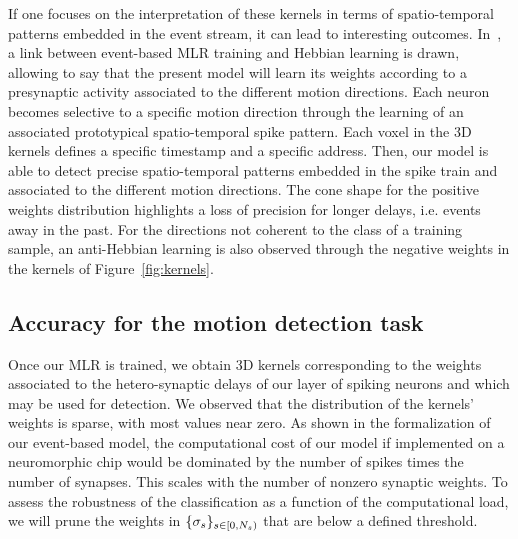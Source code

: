 \documentclass[default]{sn-jnl}%
\theoremstyle{thmstyleone}%
\theoremstyle{thmstyletwo}%
\theoremstyle{thmstylethree}%
\begin{document}
If one focuses on the interpretation of these kernels in terms of spatio-temporal patterns embedded in the event stream, it can lead to interesting outcomes. In~\citep{grimaldi_robust_2022}, a link between event-based MLR training and Hebbian learning is drawn, allowing to say that the present model will learn its weights according to a presynaptic activity associated to the different motion directions. Each neuron becomes selective to a specific motion direction through the learning of an associated prototypical spatio-temporal spike pattern. Each voxel in the 3D kernels defines a specific timestamp and a specific address. Then, our model is able to detect precise spatio-temporal patterns embedded in the spike train and associated to the different motion directions. The cone shape for the positive weights distribution highlights a loss of precision for longer delays, i.e. events away in the past. For the directions not coherent to the class of a training sample, an anti-Hebbian learning is also observed through the negative weights in the kernels of Figure~\ref{fig:kernels}. 
%
\subsection{Accuracy for the motion detection task}
%
Once our MLR is trained, we obtain 3D kernels corresponding to the weights associated to the hetero-synaptic delays of our layer of spiking neurons and which may be used for detection. We observed that the distribution of the kernels' weights is sparse, with most values near zero. As shown in the formalization of our event-based model, the computational cost of our model if implemented on a neuromorphic chip would be dominated by the number of spikes times the number of synapses. This scales with the number of nonzero synaptic weights. To  assess the robustness of the classification as a function of the computational load, we will prune the weights in $\{\sigma_s\}_{s \in [0,N_{s})}$ that are below a defined threshold. 
\end{document}
